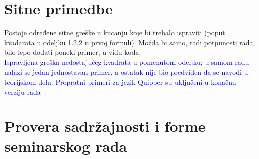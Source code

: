 \documentclass[a4paper]{report}
\newcommand{\odgovor}[1]{\textcolor{blue}{#1}}
\begin{document}
\section{Sitne primedbe}
Postoje određene sitne greške u kucanju koje bi trebalo ispraviti (poput kvadarata u odeljku 1.2.2 
u prvoj formuli). Možda bi samo, radi potpunosti rada, bilo lepo dodati poneki primer, u vidu koda.\\
\odgovor {Ispravljena greška nedostajućeg kvadrata u pomenutom odeljku; u samom radu nalazi se jedan jednostavan primer, a ostatak nije bio predviđen da se navodi u teorijskom delu. Propratni primeri za jezik Quipper su uključeni u konačnu verziju rada}
\section{Provera sadržajnosti i forme seminarskog rada}
\end{document}
